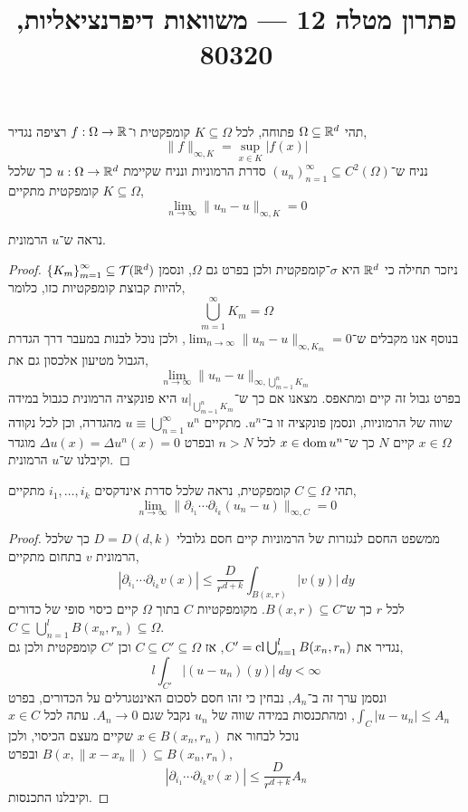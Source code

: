 
\title{פתרון מטלה 12 --- משוואות דיפרנציאליות, 80320}

\DeclareMathOperator\Div{div}

\usepackage{pgfplots, tikz, pgffor}
\usetikzlibrary{math}
\pgfplotsset{compat=1.18}


\maketitle
\maketitleprint[blue]{}

\question{}
תהי $\Omega \subseteq \mathbb{R}^d$ פתוחה, לכל $K \subseteq \Omega$ קומפקטית ו־$f : \Omega \to \mathbb{R}$ רציפה נגדיר,
\[
	\lVert f \rVert_{\infty, K}
	= \sup_{x \in K} |f(x)|
\]
נניח ש־${(u_n)}_{n = 1}^{\infty} \subseteq C^2(\Omega)$ סדרת הרמוניות ונניח שקיימת $u : \Omega \to \mathbb{R}^d$ כך שלכל $K \subseteq \Omega$ קומפקטית מתקיים,
\[
	\lim_{n \to \infty} \lVert u_n - u \rVert_{\infty, K}
	= 0
\]

\subquestion{}
נראה ש־$u$ הרמונית.
\begin{proof}
	ניזכר תחילה כי $\mathbb{R}^d$ היא $\sigma$־קומפקטית ולכן בפרט גם $\Omega$, ונסמן ${\{ K_m \}}_{m = 1}^\infty \subseteq \mathcal{T}(\mathbb{R}^d)$ להיות קבוצת קומפקטיות כזו, כלומר,
	\[
		\bigcup_{m = 1}^\infty K_m
		= \Omega
	\]
	בנוסף אנו מקבלים ש־$\lim_{n \to \infty} \lVert u_n - u \rVert_{\infty, K_m} = 0$, ולכן נוכל לבנות במעבר דרך הגדרת הגבול מטיעון אלכסון גם את,
	\[
		\lim_{n \to \infty} \lVert u_n - u \rVert_{\infty, \bigcup_{m = 1}^n K_m}
	\]
	בפרט גבול זה קיים ומתאפס.
	מצאנו אם כך ש־$u |_{\bigcup_{m = 1}^n K_m}$ היא פונקציה הרמונית כגבול במידה שווה של הרמוניות, ונסמן פונקציה זו ב־$u^n$.
	מתקיים $u \equiv \bigcup_{n = 1}^\infty u^n$ מהגדרה, וכן לכל נקודה $x \in \Omega$ קיים $N$ כך ש־$x \in \operatorname{dom} u^n$ לכל $n > N$ ובפרט $\Delta u(x) = \Delta u^n(x) = 0$ מוגדר וקיבלנו ש־$u$ הרמונית.
\end{proof}

\subquestion{}
תהי $C \subseteq \Omega$ קומפקטית,
נראה שלכל סדרת אינדקסים $i_1, \ldots, i_k$ מתקיים,
\[
	\lim_{n \to \infty} \lVert \partial_{i_1} \cdots \partial_{i_k} (u_n - u) \rVert_{\infty, C}
	= 0
\]
\begin{proof}
	ממשפט החסם לנגזרות של הרמוניות קיים חסם גלובלי $D = D(d, k)$ כך שלכל הרמונית $v$ בתחום מתקיים,
	\[
		|\partial_{i_1} \cdots \partial_{i_k} v(x)|
		\le \frac{D}{r^{d + k}} \int_{B(x, r)} |v(y)|\ dy
	\]
	לכל $r$ כך ש־$B(x, r) \subseteq C$.
	מקומפקטיות $C$ בתוך $\Omega$ קיים כיסוי סופי של כדורים $C \subseteq \bigcup_{n = 1}^l B(x_n, r_n) \subseteq \Omega$. \\
	נגדיר את $C' = \operatorname{cl} \bigcup_{n = 1}^l B(x_n, r_n)$, אז $C \subseteq C' \subseteq \Omega$ וכן $C'$ קומפקטית ולכן גם,
	\[
		l \int_{C'} |(u - u_n)(y)|\ dy
		< \infty
	\]
	ונסמן ערך זה ב־$A_n$, נבחין כי זהו חסם לסכום האינטגרלים על הכדורים, בפרט $\int_C |u - u_n| \le A_n$, ומהתכנסות במידה שווה של $u_n$ נקבל שגם $A_n \to 0$.
	עתה לכל $x \in C$ נוכל לבחור את $x \in B(x_n, r_n)$ שקיים מעצם הכיסוי, ולכן $B(x, \lVert x - x_n \rVert) \subseteq B(x_n, r_n)$ ובפרט,
	\[
		|\partial_{i_1} \cdots \partial_{i_k} v(x)|
		\le \frac{D}{r^{d + k}} A_n
	\]
	וקיבלנו התכנסות.
\end{proof}

